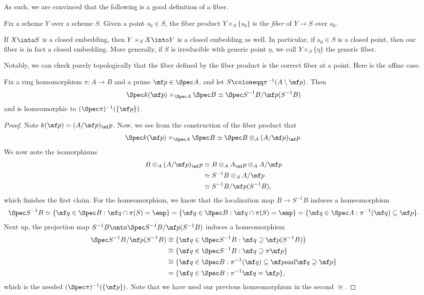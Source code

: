 \documentclass[../notes.tex]{subfiles}
\begin{document}
As such, we are convinced that the following is a good definition of a fiber.
\begin{definition}[Fiber]
	Fix a scheme $Y$ over a scheme $S$. Given a point $s_0\in S$, the fiber product $Y\times_S\{s_0\}$ is the \textit{fiber} of $Y\to S$ over $s_0$.
\end{definition}
\begin{remark}
	If $X\into S$ is a closed embedding, then $Y\times_SX\into Y$ is a closed embedding as well. In particular, if $s_0\in S$ is a closed point, then our fiber is in fact a closed embedding. More generally, if $S$ is irreducible with generic point $\eta$, we call $Y\times_S\{\eta\}$ the generic fiber.
\end{remark}
Notably, we can check purely topologically that the fiber defined by the fiber product is the correct fiber at a point. Here is the affine case.
\begin{lemma} \label{lem:affine-fibers}
	Fix a ring homomorphism $\pi\colon A\to B$ and a prime $\mf p\in\Spec A$, and let $S\coloneqq\pi^{-1}(A\setminus\mf p)$. Then
	\[\Spec k(\mf p)\times_{\Spec A}\Spec B\simeq\Spec S^{-1}B/\mf p(S^{-1}B)\]
	and is homeomorphic to $(\Spec \pi)^{-1}(\{\mf p\})$.
\end{lemma}
\begin{proof}
	Note $k(\mf p)=(A/\mf p)_\mf p$. Now, we see from the construction of the fiber product that
	\[\Spec k(\mf p)\times_{\Spec A}\Spec B\simeq\Spec B\otimes_A(A/\mf p)_\mf p.\]
	We now note the isomorphisms
	\begin{align*}
		B \otimes_A (A/\mf p)_\mf p &\simeq B\otimes_A A_\mf p \otimes_A A/\mf p \\
		&\simeq S^{-1}B \otimes_A A/\mf p \\
		&\simeq S^{-1}B/\mf p(S^{-1}B),
	\end{align*}
	which finishes the first claim. For the homeomorphism, we know that the localization map $B\to S^{-1}B$ induces a homeomorphism
	\[\Spec S^{-1}B\simeq\{\mf q\in\Spec B:\mf q\cap\pi(S)=\emp\}=\{\mf q\in\Spec B:\mf q\cap\pi(S)=\emp\}=\{\mf q\in\Spec A:\pi^{-1}(\mf q)\subseteq\mf p\}.\]
	Next up, the projection map $S^{-1}B\onto\Spec S^{-1}B/\mf p(S^{-1}B)$ induces a homeomorphism
	\begin{align*}
		\Spec S^{-1}B/\mf p(S^{-1}B) &\cong \{\mf q\in\Spec S^{-1}B:\mf q\supseteq\mf p(S^{-1}B)\} \\
		&\cong \{\mf q\in\Spec S^{-1}B:\mf q\supseteq\pi\mf p\} \\
		&\cong \{\mf q\in\Spec B:\pi^{-1}(\mf q)\subseteq\mf p\text{and}\mf q\supseteq\mf p\} \\
		&= \{\mf q\in\Spec B:\pi^{-1}\mf q=\mf p\},
	\end{align*}
	which is the needed $(\Spec\pi)^{-1}(\{\mf p\})$. Note that we have used our previous homeomorphism in the second $\cong$.
\end{proof}
\end{document}
